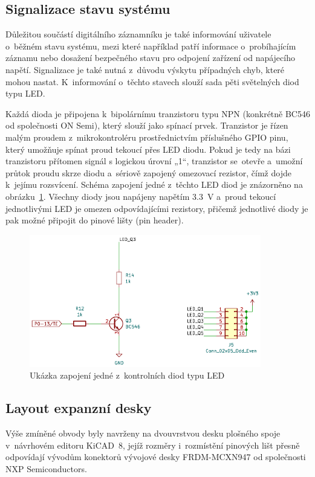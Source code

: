 \newpage

\subsection{Signalizace stavu systému}
Důležitou součástí digitálního záznamníku je také informování uživatele o~běžném stavu systému, mezi které například patří informace o~probíhajícím záznamu nebo dosažení bezpečného stavu pro odpojení zařízení od napájecího napětí. Signalizace je také nutná z~důvodu výskytu případných chyb, které mohou nastat. K~informování o~těchto stavech slouží sada pěti světelných diod typu LED.

Každá dioda je připojena k~bipolárnímu tranzistoru typu NPN (konkrétně BC546 od společnosti ON Semi), který slouží jako spínací prvek. Tranzistor je řízen malým proudem z~mikrokontroléru prostřednictvím příslušného GPIO pinu, který umožňuje spínat proud tekoucí přes LED diodu. Pokud je tedy na bázi tranzistoru přítomen signál s logickou úrovní „1“, tranzistor se~otevře a~umožní průtok proudu skrze diodu a~sériově zapojený omezovací rezistor, čímž dojde k~jejímu rozsvícení. Schéma zapojení jedné z~těchto LED diod je znázorněno na obrázku~\ref{fig:control-diodes}. Všechny diody jsou napájeny napětím \SI{3.3}{\volt} a~proud tekoucí jednotlivými LED je omezen odpovídajícími rezistory, přičemž jednotlivé diody je pak možné připojit do pinové lišty (pin header).

\begin{figure}[h]
    \centering
    \includegraphics[width=0.90\textwidth]{obrazky-figures/led-diodes.pdf}
    
    \caption{Ukázka zapojení jedné z~kontrolních diod typu LED}
    \label{fig:control-diodes}
\end{figure}

\newpage

\subsection{Layout expanzní desky}
\label{bom_list}
Výše zmíněné obvody byly navrženy na dvouvrstvou desku plošného spoje v~návrhovém editoru KiCAD~8, jejíž rozměry i~rozmístění pinových lišt přesně odpovídají vývodům konektorů vývojové desky FRDM-MCXN947 od společnosti NXP Semiconductors.~\cite{KiCAD}

